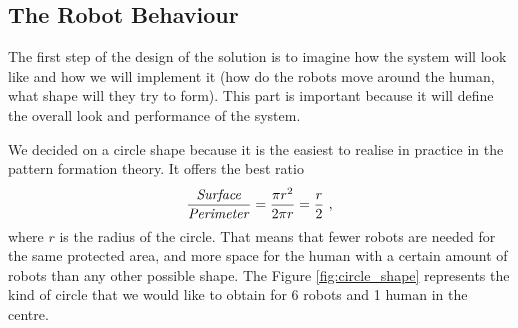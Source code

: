 \documentclass[oneside, a4paper, 12pt]{memoir}
\begin{document}
	\subsection{The Robot Behaviour}
	\label{sec:robot_behaviour}
	

	
	The first step of the design of the solution is to imagine how the system will look like and how we will implement it (how do the robots move around the human, what shape will they try to form). This part is important because it will define the overall look and performance of the system.
	
	We decided on a circle shape because it is the easiest to realise in practice in the pattern formation theory. It offers the best ratio
	$$\frac{\mbox{\textit{Surface}}}{\mbox{\textit{Perimeter}}} = \frac{\pi r^2}{2\pi r} = \frac{r}{2}~\mbox{,}$$
	 where $r$ is the radius of the circle. That means that fewer robots are needed for the same protected area, and more space for the human with a certain amount of robots than any other possible shape. The Figure \ref{fig:circle_shape} represents the kind of circle that we would like to obtain for 6 robots and 1 human in the centre.%
	
\end{document}
